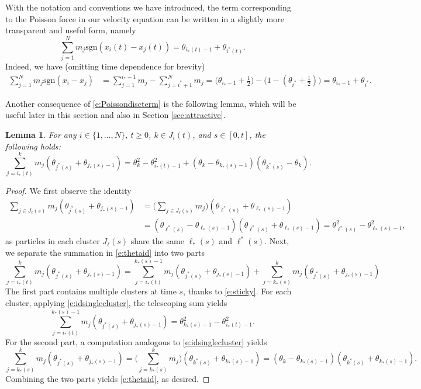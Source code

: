 \documentclass[11pt,reqno]{amsart}
\newtheorem{lemma}[theorem]{Lemma}
\theoremstyle{definition}
\theoremstyle{remark}
\newcommand{\sgn}[1]{\mathrm{sgn}(#1)}
\begin{document}
	
	
	With the notation and conventions we have introduced, the term corresponding to the Poisson force in our velocity equation can be written in a slightly more transparent and useful form, namely 
	\begin{equation}
		\label{e:Poissondiscterm}
		\sum_{j=1}^N m_j \sgn{x_i(t)-x_j(t)}
		= \theta_{i_*(t)-1} + \theta_{i^*(t)}.
	\end{equation}
	Indeed, we have (omitting time dependence for brevity)
	\begin{align*}
		\sum_{j=1}^N m_j \sgn{x_i-x_j} & = \sum_{j=1}^{i_*-1}m_j - \sum_{j=i^*+1}^N m_j = \big(\theta_{i_*-1}+\tfrac12\big) - \big(1-(\theta_{i^*}+\tfrac12)\big)
		= \theta_{i_*-1} + \theta_{i^*}.
	\end{align*}
	
	
	Another consequence of \eqref{e:Poissondiscterm} is the following lemma, which will be useful later in this section and also in Section \ref{sec:attractive}.
	\begin{lemma}
		\label{l:thetaid}
		For any $i\in \{1, \ldots, N\}$, $t\ge 0$, $k\in J_i(t)$, and $s\in [0,t]$, the following holds:
		\begin{equation} 
			\label{e:thetaid}
			\sum_{j=i_*(t)}^k m_j (\theta_{j^*(s)} + \theta_{j_*(s) - 1}) = \theta_k^2 - \theta_{i_*(t)-1}^2 + (\theta_k - \theta_{k_*(s) - 1})(\theta_{k^*(s)} - \theta_k). 
		\end{equation} 
	\end{lemma}
	\begin{proof}
		We first observe the identity
		\begin{align}
			\sum_{j\in J_\ell(s)} m_j (\theta_{j^*(s)} + \theta_{j_*(s) - 1}) & = \Big(\sum_{j\in J_\ell(s)} m_j\Big) (\theta_{\ell^*(s)} + \theta_{\ell_*(s) - 1})\nonumber\\
			& = (\theta_{\ell^*(s)} - \theta_{\ell_*(s) - 1})(\theta_{\ell^*(s)} + \theta_{\ell_*(s) - 1}) = \theta_{\ell^*(s)}^2 - \theta_{\ell_*(s) - 1}^2,\label{e:idsinglecluster}
		\end{align}
		as particles in each cluster $J_\ell(s)$ share the same $\ell_*(s)$ and $\ell^*(s)$. Next, we separate the summation in \eqref{e:thetaid} into two parts
		\[
		\sum_{j=i_*(t)}^k m_j (\theta_{j^*(s)} + \theta_{j_*(s) - 1}) = \sum_{j=i_*(t)}^{k_*(s)-1} m_j (\theta_{j^*(s)} + \theta_{j_*(s) - 1}) + \sum_{j=k_*(s)}^k m_j (\theta_{j^*(s)} + \theta_{j_*(s) - 1})
		\]
		The first part contains multiple clusters at time $s$, thanks to \eqref{e:sticky}. For each cluster, applying \eqref{e:idsinglecluster}, the telescoping sum yields
		\[
		\sum_{j=i_*(t)}^{k_*(s)-1} m_j (\theta_{j^*(s)} + \theta_{j_*(s) - 1}) = \theta_{k_*(s)-1}^2 - \theta_{i_*(t)-1}^2.
		\]
		For the second part, a computation analogous to \eqref{e:idsinglecluster} yields
		\[
		\sum_{j=k_*(s)}^k m_j (\theta_{j^*(s)} + \theta_{j_*(s) - 1}) = \Big(\sum_{j=k_*(s)}^k m_j\Big) (\theta_{k^*(s)} + \theta_{k_*(s) - 1})
		= (\theta_{k} - \theta_{k_*(s) - 1})(\theta_{k^*(s)} + \theta_{k_*(s) - 1}).
		\]
		Combining the two parts yields \eqref{e:thetaid}, as desired.
	\end{proof}
\end{document}
